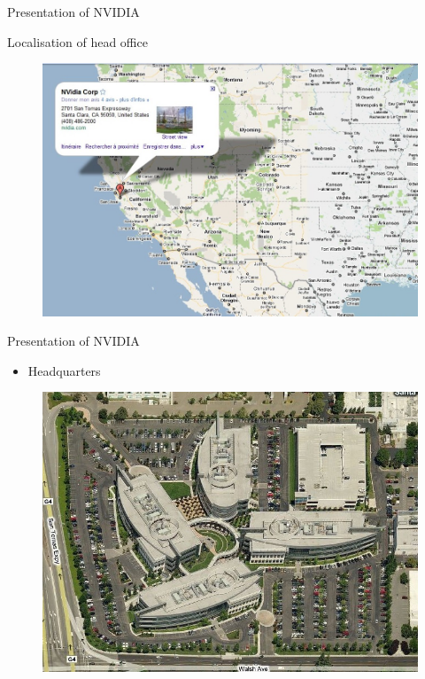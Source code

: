 \documentclass{beamer}
\begin{document}
\begin{frame}{Presentation of NVIDIA}
	\transdissolve[duration=0.08]
	\begin{block}{Localisation of head office}
	\begin{figure}[h]
		\includegraphics[width=1.05\textheight]{images/nvidiamap.jpg}
	\end{figure}
	\end{block}
\end{frame}

\begin{frame}{Presentation of NVIDIA}
	\transdissolve[duration=0.08]
	\begin{itemize}
		\item<+->{Headquarters}
	\end{itemize}
	\begin{figure}[h]
		\includegraphics[width=1.00\textheight]{images/nvidia_locaux.jpg}
	\end{figure}
\end{frame}
\end{document}
